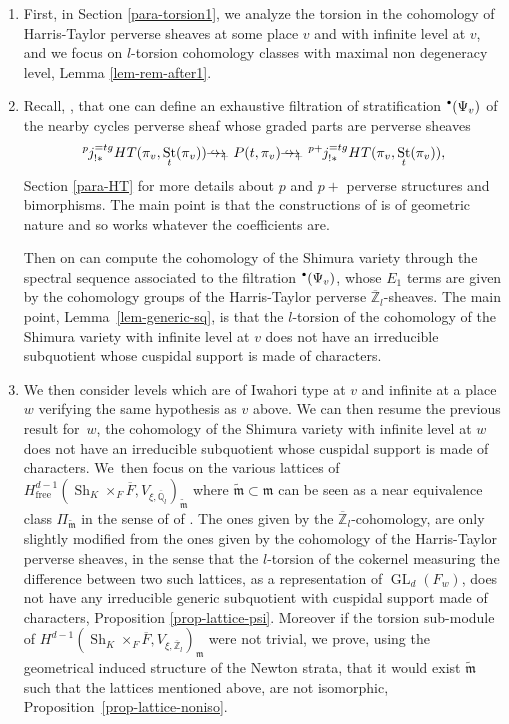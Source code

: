 \documentclass[JEP,XML,SOM,Unicode,published]{cedram}
\newcommand{\NoChangel}[1]{%
\expandafter\let\csname old\string#1\endcsname=#1
\let#1=\relax
\newcommand{#1}{\mathcode`l="716C\csname old\string#1\endcsname\mathcode`l="7160 }%
}
\newcommand{\onto}{\mathchoice{\to\hspace*{-5mm}\to}{\to\hspace*{-2.85mm}\to}{\to\hspace*{-3mm}\to}{\to\hspace*{-3mm}\to}}
\newcommand{\sbullet}{{\scriptscriptstyle\bullet}}
\newcommand{\csbullet}{{\raisebox{1pt}{$\sbullet$}}}
\DeclareMathOperator{\GL}{GL}
\newcommand{\free}{\mathrm{free}}
\newcommand*{\htarrow}{\lhook\joinrel\onto}
\newcommand*{\htarrowp}{\mathrel{{\htarrow}_+}}
\theoremstyle{plain}
\theoremstyle{definition}
\numberwithin{equation}{subsection}
\newcommand\Qm{{\mathbb Q}}
\newcommand\Zm{{\mathbb Z}}
\newcommand{\lexp}[2]{\kern \scriptspace \vphantom{#2}^{#1}\kern-\scriptspace#2}
\DeclareMathOperator{\sh}{Sh}
\DeclareMathOperator{\st}{St}
\DeclareMathOperator{\Fill}{Fill}\NoChangel{\Fill}
\begin{document}
\begin{enumerate}
\item
First, in Section \ref{para-torsion1}, we analyze the torsion in the
cohomology of Harris-Taylor perverse sheaves at some place
$v$ and with infinite level at $v$, and we focus on $l$-torsion cohomology
classes with maximal non degeneracy level, \cf Lemma \ref{lem-rem-after1}.

\item
Recall, \cf \cite{boyer-torsion}, that one can define an exhaustive filtration
of stratification $\Fill^{\csbullet}(\Psi_v)$ of the nearby cycles perverse sheaf
whose graded parts are perverse sheaves
\[
\lexp p j^{=tg}_{!*} HT(\pi_v,\st_t(\pi_v)) \htarrowp P(t,\pi_v) \htarrowp
\lexp {p+} j^{=tg}_{!*} HT(\pi_v,\st_t(\pi_v)),
\]
\cf Section \ref{para-HT} for more details about $p$ and $p+$ perverse structures
and bimorphisms. The main point is that the constructions of \cite{boyer-torsion}
is of geometric nature and so works whatever the coefficients are.

Then on can
compute the cohomology of the Shimura variety through the
spectral sequence associated to the filtration
$\Fill^{\csbullet}(\Psi_v)$, whose
$E_1$ terms are given by the cohomology groups of the
Harris-Taylor perverse $\overline \Zm_l$-sheaves.
The main point, \cf Lemma~\ref{lem-generic-sq}, is that the $l$-torsion of the
cohomology of the Shimura variety with infinite level at $v$ does not have
an irreducible subquotient whose cuspidal support is made of characters.

\item
We then consider levels which are of Iwahori type at $v$ and infinite
at a place~$w$ verifying the same
hypothesis as $v$ above. We can then resume the previous result for~$w$, \ie the cohomology of the Shimura variety with infinite level at $w$ does not have
an irreducible subquotient whose cuspidal support is made of characters.
We~then focus on the various
lattices of $H^{d-1}_{\free}(\sh_{K} \times_F \overline F,V_{\xi,\overline \Qm_l})_{\widetilde{\mathfrak m}}$ where $\widetilde{\mathfrak m} \subset
\mathfrak m$ can be seen as a near equivalence class $\Pi_{\widetilde{\mathfrak m}}$
in the sense of of \cite{y-t}. The ones given by the
$\overline \Zm_l$\nobreakdash-cohomology,
are only slightly modified from the ones given by the cohomology of the
Harris-Taylor perverse sheaves, in the sense that the $l$-torsion of the
cokernel measuring the difference between two such lattices, as a representation
of $\GL_d(F_w)$, does not have any
irreducible generic subquotient with cuspidal
support made of characters, \cf Proposition \ref{prop-lattice-psi}.
Moreover if the torsion sub-module of
$H^{d-1}(\sh_{K} \times_F \overline F,V_{\xi,\overline \Zm_l})_{\mathfrak m}$ were not trivial, we prove, using the geometrical induced structure of the
Newton strata, that it would exist $\widetilde{\mathfrak m}$
such that the lattices mentioned above, are not isomorphic, \cf Proposition~\ref{prop-lattice-noniso}.


\end{enumerate}
\end{document}
